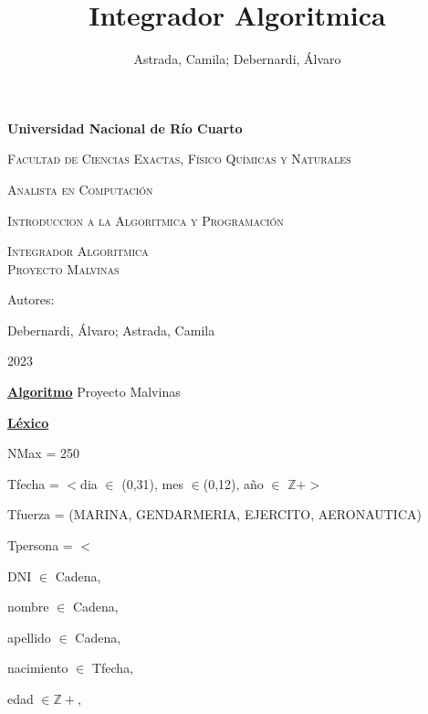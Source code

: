 \documentclass{article}
\title{Integrador Algoritmica}
\author{Astrada, Camila; Debernardi, Álvaro}
\begin{document}
    \begin{titlepage}
        \centering
        {\bfseries\LARGE Universidad Nacional de Río Cuarto \par}
        \vspace{1cm}
        {\scshape\Large Facultad de Ciencias Exactas, Físico Químicas y Naturales \par}
        {\scshape\Large Analista en Computación \par}
        {\scshape\Large Introduccion a la Algoritmica y Programación\par}
        \vspace{3cm}
        {\scshape\Huge Integrador Algoritmica \\ Proyecto Malvinas\par}
        \vspace{3cm}
        \vfill
        {\Large Autores: \par}
        {\Large Debernardi, Álvaro; Astrada, Camila\par}
        \vfill
        {\Large 2023 \par} 
    \end{titlepage}

    \underline{\textbf{Algoritmo}} Proyecto Malvinas

    \underline{\textbf{Léxico}}

    \hspace{4mm}NMax = 250

    \hspace{4mm}Tfecha = $<$dia $\in$ (0,31), mes $\in$(0,12), año $\in$ $\mathbb{Z}+>$

    \hspace{4mm}Tfuerza = (MARINA, GENDARMERIA, EJERCITO, AERONAUTICA)

    \hspace{4mm}Tpersona = $<$
    
        \hspace{8mm}DNI $\in$ Cadena, 
        
        \hspace{8mm}nombre $\in$ Cadena, 
        
        \hspace{8mm}apellido $\in$ Cadena, 
        
        \hspace{8mm}nacimiento $\in$ Tfecha, 
        
        \hspace{8mm}edad $\in \mathbb{Z}+$, 
        
\end{document}
